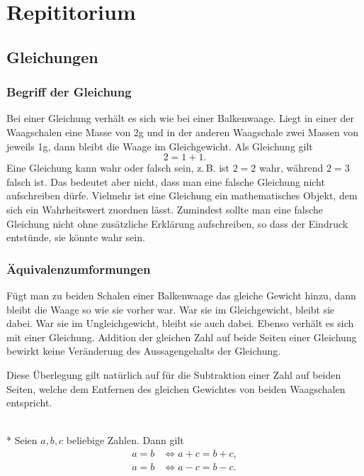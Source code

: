 
\chapter{Repititorium}

\section{Gleichungen}
\subsection{Begriff der Gleichung}

Bei einer Gleichung verhält es sich wie bei einer Balkenwaage. Liegt
in einer der Waagschalen eine Masse von 2g und in der anderen
Waagschale zwei Massen von jeweils 1g, dann bleibt die Waage im
Gleichgewicht. Als Gleichung gilt
\[2=1+1.\]
Eine Gleichung kann wahr oder falsch sein, z.\,B. ist $2=2$
wahr, während $2=3$ falsch ist. Das bedeutet aber nicht, dass man
eine falsche Gleichung nicht aufschreiben dürfe. Vielmehr ist eine
Gleichung ein mathematisches Objekt, dem sich ein Wahrheitswert
zuordnen lässt. Zumindest sollte man eine falsche Gleichung nicht
ohne zusätzliche Erklärung aufschreiben, so dass der Eindruck
entstünde, sie könnte wahr sein.

\subsection{Äquivalenzumformungen}%

Fügt man zu beiden Schalen einer Balkenwaage das gleiche Gewicht
hinzu, dann bleibt die Waage so wie sie vorher war. War sie im
Gleichgewicht, bleibt sie dabei. War sie im Ungleichgewicht,
bleibt sie auch dabei. Ebenso verhält es sich mit einer Gleichung.
Addition der gleichen Zahl auf beide Seiten einer Gleichung bewirkt
keine Veränderung des Aussagengehalts der Gleichung.

Diese Überlegung gilt natürlich auf für die Subtraktion einer Zahl
auf beiden Seiten, welche dem Entfernen des gleichen Gewichtes von
beiden Waagschalen entspricht.

\begin{Satz}[Äquivalenzumformungen]\label{eq-add}\mbox{}\\*
Seien $a,b,c$ beliebige Zahlen. Dann gilt
\begin{align*}
a=b&\iff a+c=b+c,\\
a=b&\iff a-c=b-c.
\end{align*}
\end{Satz}

